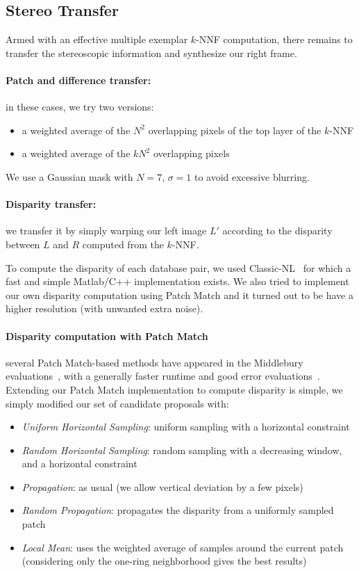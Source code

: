 
\subsection{Stereo Transfer}
\label{sec:transfer}
Armed with an effective multiple exemplar $k$-NNF computation, there remains to transfer the stereoscopic information and synthesize our right frame.

\paragraph{Patch and difference transfer:} in these cases, we try two versions:
\begin{itemize}
	\item a weighted average of the $N^2$ overlapping pixels of the top layer of the $k$-NNF
	\item a weighted average of the $kN^2$ overlapping pixels
\end{itemize}
We use a Gaussian mask with $N=7$, $\sigma=1$ to avoid excessive blurring.

\paragraph{Disparity transfer:} we transfer it by simply warping our left image $L'$ according to the disparity between $L$ and $R$ computed from the $k$-NNF.

To compute the disparity of each database pair, we used Classic-NL~\cite{Deqing10} for which a fast and simple Matlab/C++ implementation exists.
We also tried to implement our own disparity computation using Patch Match and it turned out to be have a higher resolution (with unwanted extra noise).

\paragraph{Disparity computation with Patch Match} several Patch Match-based methods have appeared in the Middlebury evaluations~\cite{Scharstein02}, with a generally faster runtime and good error evaluations~\cite{Bleyer11, Heise13, Jiangbo13, Besse14}.
Extending our Patch Match implementation to compute disparity is simple, we simply modified our set of candidate proposals with:
\begin{itemize}
	\item \emph{Uniform Horizontal Sampling}: uniform sampling with a horizontal constraint
	\item \emph{Random Horizontal Sampling}: random sampling with a decreasing window, and a horizontal constraint
	\item \emph{Propagation}: as usual (we allow vertical deviation by a few pixels)
	\item \emph{Random Propagation}: propagates the disparity from a uniformly sampled patch
	\item \emph{Local Mean}: uses the weighted average of samples around the current patch (considering only the one-ring neighborhood gives the best results)
\end{itemize}


